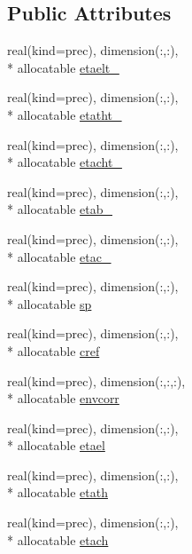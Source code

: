 \subsection*{Public Attributes}
\begin{DoxyCompactItemize}
\item 
real(kind=prec), dimension(\-:,\-:), \\*
allocatable \hyperlink{classplantvar_a42c8e330560c87b991b46be04c40a03d}{etaelt\-\_\-}
\item 
real(kind=prec), dimension(\-:,\-:), \\*
allocatable \hyperlink{classplantvar_a355b18c048762925b750fe247a09c4cd}{etatht\-\_\-}
\item 
real(kind=prec), dimension(\-:,\-:), \\*
allocatable \hyperlink{classplantvar_a1bfe35beb70f107ed930740d7ce7189a}{etacht\-\_\-}
\item 
real(kind=prec), dimension(\-:,\-:), \\*
allocatable \hyperlink{classplantvar_a4307773fae45ef7c05c590189ae40c32}{etab\-\_\-}
\item 
real(kind=prec), dimension(\-:,\-:), \\*
allocatable \hyperlink{classplantvar_ab3e228857f49d79572bc7071e650ae33}{etac\-\_\-}
\item 
real(kind=prec), dimension(\-:,\-:), \\*
allocatable \hyperlink{classplantvar_a0ecfac9070622328232608ce808ede2b}{sp}
\item 
real(kind=prec), dimension(\-:,\-:), \\*
allocatable \hyperlink{classplantvar_a5ddb9d753dc518aed9d34c9e1f5335e0}{cref}
\item 
real(kind=prec), dimension(\-:,\-:,\-:), \\*
allocatable \hyperlink{classplantvar_a187eaf8e3b46428daf4b89db350aa0f1}{envcorr}
\item 
real(kind=prec), dimension(\-:,\-:), \\*
allocatable \hyperlink{classplantvar_a1a1a32a309c970c5ccccda52cbc92e36}{etael}
\item 
real(kind=prec), dimension(\-:,\-:), \\*
allocatable \hyperlink{classplantvar_a226f4150db308d7f4c46da8f297127af}{etath}
\item 
real(kind=prec), dimension(\-:,\-:), \\*
allocatable \hyperlink{classplantvar_a1bae392336fb8d7f0376c7e98163003e}{etach}
\item 

\end{DoxyCompactItemize}
